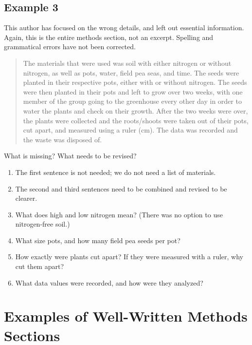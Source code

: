 \documentclass[
]{book}
\providecommand{\tightlist}{%
  \setlength{\itemsep}{0pt}\setlength{\parskip}{0pt}}
\begin{document}
\hypertarget{example-3-3}{%
\subsection{Example 3}\label{example-3-3}}

This author has focused on the wrong details, and left out essential information. Again, this is the entire methods section, not an excerpt. Spelling and grammatical errors have not been corrected.

\begin{quote}
The materials that were used was soil with either nitrogen or without nitrogen, as well as pots, water, field pea seas, and time. The seeds were planted in their respective pots, either with or without nitrogen. The seeds were then planted in their pots and left to grow over two weeks, with one member of the group going to the greenhouse every other day in order to water the plants and check on their growth. After the two weeks were over, the plants were collected and the roots/shoots were taken out of their pots, cut apart, and measured using a ruler (cm). The data was recorded and the waste was disposed of.
\end{quote}

What is missing? What needs to be revised?

\begin{enumerate}
\def\labelenumi{\arabic{enumi}.}
\tightlist
\item
  The first sentence is not needed; we do not need a list of materials.
\item
  The second and third sentences need to be combined and revised to be clearer.
\item
  What does high and low nitrogen mean? (There was no option to use nitrogen-free soil.)
\item
  What size pots, and how many field pea seeds per pot?
\item
  How exactly were plants cut apart? If they were measured with a ruler, why cut them apart?
\item
  What data values were recorded, and how were they analyzed?
\end{enumerate}

\hypertarget{examples-of-well-written-methods-sections}{%
\section{Examples of Well-Written Methods Sections}\label{examples-of-well-written-methods-sections}}
\end{document}
